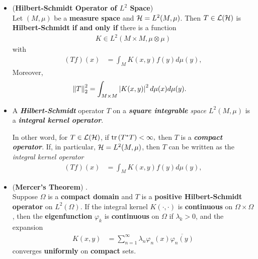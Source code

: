 \documentclass[11pt]{article}
\begin{document}
\begin{itemize}
\item \begin{theorem} (\textbf{Hilbert-Schmidt Operator of $L^2$ Space}) \citep{reed1980methods}\\
Let $(M, \mu)$ be a \textbf{measure space} and  ${\mathcal H} = L^2(M, \mu)$.  Then $T \in {\mathcal L}({\mathcal H})$ is \textbf{Hilbert-Schmidt} \textbf{if and only if} there is a function 
\begin{align*}
K \in L^2(M \times M, \mu \otimes \mu)
\end{align*}
with 
\begin{align*}
(T f)(x) &= \int_{M} K(x, y)f(y) d\mu(y),
\end{align*}
Moreover, 
\begin{align*}
\left\|T\right\|_{2}^2 &= \int_{M \times M} \left\lvert K(x, y) \right\rvert^2 d\mu(x) d\mu(y).
\end{align*}
\end{theorem}


\item \begin{remark}
A \emph{\textbf{Hilbert-Schmidt}} operator $T$ on a \emph{\textbf{square integrable} space $L^2(M, \mu)$} is a \emph{\textbf{integral kernel operator}}.

In other word, for $T \in {\mathcal L}({\mathcal H})$, if $\mathrm{tr}\left(T^{*}T \right) < \infty,$ then $T$ is a \emph{\textbf{compact operator}}. If, in particular, ${\mathcal H} = L^2(M, \mu)$, then $T$ can be written as the \emph{integral kernel operator} 
\begin{align*}
(T f)(x) &= \int_{M} K(x, y)f(y) d\mu(y),
\end{align*}
\end{remark}

\item \begin{theorem}  (\textbf{Mercer's Theorem}) \citep{borthwick2020spectral}. \\
Suppose $\Omega$ is a \textbf{compact domain} and $T$ is a \textbf{positive Hilbert-Schmidt operator} on $L^2(\Omega)$. If the integral kernel $K(\cdot, \cdot)$ is
\textbf{continuous} on $\Omega \times \Omega$, then the \textbf{eigenfunction} $\varphi_k$ is \textbf{continuous} on $\Omega$ if $\lambda_k > 0$, and
the expansion
\begin{align*}
K(x,y) &= \sum_{n=1}^{\infty}\lambda_{n}\varphi_n(x)\overline{\varphi_n(y)}
\end{align*}
converges \textbf{uniformly} on \textbf{compact} sets.
\end{theorem}
\end{itemize}
\end{document}
